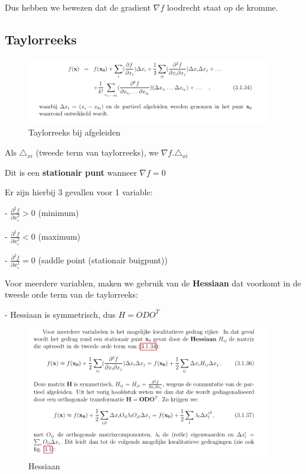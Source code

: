 \documentclass[a4paper]{report}
\begin{document}
Dus hebben we bewezen dat de gradient $\nabla f$ loodrecht staat op de kromme.

\subsection{Taylorreeks}

\begin{figure}[H]
	\begin{center}
		\includegraphics[width=0.95\textwidth]{./images/taylor_afgeleid.png}
	\end{center}
	\caption{Taylorreeks bij afgeleiden}
	\label{}
\end{figure}

Als $\triangle_{xi}$ (tweede term van taylorreeks), we $\nabla f . \triangle_{xi}$

Dit is een \textbf{stationair punt} wanneer $\nabla f = 0$

Er zijn hierbij 3 gevallen voor 1 variable:

- $\frac{\partial^2 f}{\partial x_i^2} > 0$ (minimum)

- $\frac{\partial^2 f}{\partial x_i^2} < 0$ (maximum)

- $\frac{\partial^2 f}{\partial x_i^2} = 0$ (saddle point (stationair buigpunt))

Voor meerdere variablen, maken we gebruik van de \textbf{Hessiaan} dat voorkomt in de tweede orde term van de taylorreeks:

- Hessiaan is symmetrisch, dus $H = O D O^T$

\begin{figure}[H]
	\begin{center}
		\includegraphics[width=0.95\textwidth]{./images/hessiaan.png}
	\end{center}
	\caption{Hessiaan}
	\label{}
\end{figure}
\end{document}
